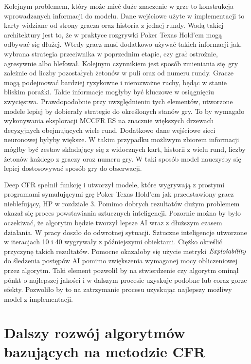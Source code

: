 \documentclass[12pt,oneside,a4paper]{report}
\begin{document}
Kolejnym problemem, który może mieć duże
znaczenie w grze to konstrukcja wprowadzanych informacji do modelu.
Dane wejściowe użyte w implementacji to karty widziane od strony gracza oraz historia 
z jednej rundy. Wadą takiej architektury jest to, że w praktyce rozgrywki Poker Texas Hold'em 
mogą odbywać się dłużej. Wtedy gracz musi dodatkowo używać takich informacji jak, wybrana strategia
przeciwnika w poprzednim etapie, czy grał ostrożnie, agresywnie albo blefował. Kolejnym czynnikiem jest 
sposób zmieniania się gry zależnie od liczby pozostałych żetonów w puli oraz od numeru rundy. Gracze
mogą podejmować bardziej ryzykowne i nierozważne ruchy, będąc w stanie bliskim porażki. Takie
informacje mogłyby być kluczowe w osiągnięciu zwycięstwa.
Prawdopodobnie przy uwzględnieniu tych elementów, utworzone modele lepiej by
dobierały strategie do określonych stanów gry. To by wymagało wykonywania eksploracji MCCFR ES na znacznie większych drzewach decyzyjnych
obejmujących wiele rund. Dodatkowo dane wejściowe sieci neuronowej byłyby większe.
W takim przypadku
możliwym zbiorem informacji mógłby być zestaw składający się z widocznych kart, historii z wielu
rund, liczby żetonów każdego z graczy oraz numeru gry. W taki sposób model nauczyłby się 
lepiej dostosowywać sposób gry do obserwacji. 


Deep CFR spełnił funkcję i utworzył modele, które wygrywają z prostymi programami symulującymi
grę Poker Texas Hold'em jak przedstawiony gracz nieblefujący, HP w rozdziale 3. Pomimo dobrych
rezultatów dużym problemem okazał się
proces powstawiania sztucznych inteligencji. Pozornie można by było oczekiwać, że
algorytm będzie tworzył lepsze AI wraz z dłuższym czasem działania. W pracy doszło do odwrotnej
sytuacji. Sztuczne inteligencje utworzone w iteracjach 10 i 40 wygrywały z późniejszymi obiektami.
Ciężko określić przyczynę takich rezultatów. Pomocne okazałoby się użycie metryki
$\emph{Exploiability}$ do śledzenia postępów AI pomimo zwiększenia wymaganej mocy obliczeniowej
przez algorytm. Taki element pozwolił by na stwierdzenie czy algorytm ominął pónkt o najlepszej
jakości i w dalszym procesie uzyskuje podobne lub coraz gorze efekty. Pozwoliło by to na zatrzymanie procesu 
uzyskując najlepszy możliwy model z implementacji.







\section{Dalszy rozwój algorytmów bazujących na metodzie CFR}
\end{document}
